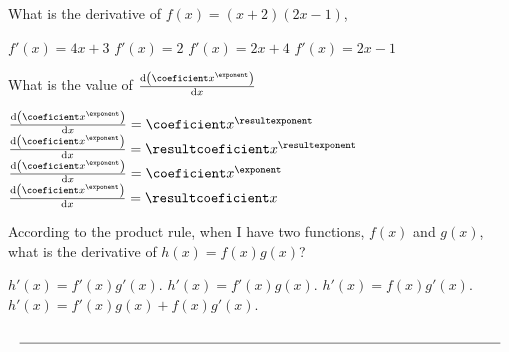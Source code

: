 \documentclass[12pt, noquestionbreak, flushbottom, customfontpath=../Fonts/]{../skrexam}  %
\begin{document}
\begin{questions}
	\question What is the derivative of  $f(x) = (x + 2)(2x- 1)$,
	\begin{choices}
		\choice\CorrectChoice $f'(x) = 4 x + 3$
		\choice $f'(x) = 2$
		\choice $f'(x) = 2x + 4$
		\choice $f'(x) = 2x - 1$
	\end{choices}




\question 
	\pgfmathtruncatemacro{\coeficient}{random(2,10)} 
	\pgfmathtruncatemacro{\resultexponent}{\exponent-1}
	\pgfmathtruncatemacro{\resultcoeficient}{\coeficient*\exponent}
	What is the value of $\dv{\qty(\coeficient x^{\exponent})}{x}$
	\begin{choices}
		\choice $\dv{\qty(\coeficient x^{\exponent})}{x} = \coeficient x^{\resultexponent}$
		\choice\CorrectChoice $\dv{\qty(\coeficient x^{\exponent})}{x} = \resultcoeficient x^{\resultexponent}$
		\choice $\dv{\qty(\coeficient x^{\exponent})}{x} = \coeficient x^{\exponent}$
		\choice $\dv{\qty(\coeficient x^{\exponent})}{x} = \resultcoeficient x$
	\end{choices}

	\question According to the product rule, when I have two functions, $f(x)$ and $g(x)$, what is the derivative of $h(x) = f(x) g(x)$?
	\begin{choices}
		\choice $h'(x) = f'(x) g '(x)$.
		\choice $h'(x) = f'(x) g(x)$.
		\choice $h'(x) = f(x) g '(x)$.
		\choice\CorrectChoice $h'(x) = f'(x) g(x)+ f(x) g '(x)$.
	\end{choices}


\end{questions}






\[
\underset{%
	}{%
	\text{\underline{\hspace{\textwidth}}}%
}
\]
\setcounter{totalpages}{\value{page}}
\setcounter{totalsections}{\value{section}}
\end{document}

